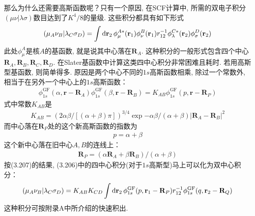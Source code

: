 那么为什么还需要高斯函数呢？只有一个原因, 
在SCF计算中, 
所需的双电子积分$(\mu\nu|\lambda\sigma)$数目达到了$K^4/8$的量级. 
这些积分都具有如下形式
\begin{align}
	(\mu_A\nu_B|\lambda_C\sigma_D) = \int\dd{r}_2\,\phi_\mu^{A*}(\bfr_1)\phi_\nu^B(\bfr_1)\twoe\phi_\lambda^{C*}(\bfr_2)\phi_\sigma^D(\bfr_2)
\end{align}
此处$\phi_\mu^A$是核$A$的基函数, 
就是说其中心落在$\mathbf{R}_A$. 
这种积分的一般形式包含四个中心$\mathbf{R}_A,\mathbf{R}_B,\mathbf{R}_C,\mathbf{R}_D$. 
在Slater基函数中计算这类四中心积分非常困难且耗时. 
若用高斯型基函数, 
则简单得多. 
原因是两个中心不同的$1s$高斯函数相乘, 
除过一个常数外, 
相当于在另外一个中心上的$1s$高斯函数：
\begin{align}
	\label{3.207}
	\phi_{1s}^\mathrm{GF}(\alpha,\mathbf{r-R}_A)\phi_{1s}^\mathrm{GF}(\beta,\mathbf{r-R}_B) = K_{AB}\phi_{1s}^\mathrm{GF}(p,\mathbf{r-R}_P)
\end{align}
式中常数$K_{AB}$是
\begin{align}
	K_{AB} = (2\alpha\beta/[(\alpha+\beta)\pi])^{3/4}\exp{-\alpha\beta/(\alpha+\beta)|\mathbf{R}_A-\mathbf{R}_B|^2}
\end{align}
而中心落在$\mathbf{R}_P$处的这个新高斯函数的指数为
\begin{align}
	p=\alpha+\beta
\end{align}
这个新中心落在旧中心$A,B$的连线上：
\begin{align}
	\mathbf{R}_P = (\alpha\mathbf{R}_A+\beta\mathbf{R}_B)/(\alpha+\beta)
\end{align}
按(3.207)的结果, 
(3.206)中的四中心积分(对于$1s$高斯型)马上可以化为双中心积分：
\begin{align}
	(\mu_A\nu_B|\lambda_C\sigma_D) =K_{AB}K_{CD} \int\dd{r}_2\,\phi_{1s}^\mathrm{GF}(p,\bfr_1-\mathbf{R}_P)\twoe\phi_{1s}^\mathrm{GF}(q,\bfr_2-\mathbf{R}_Q)
\end{align}
这种积分可按附录A中所介绍的快速积出.


